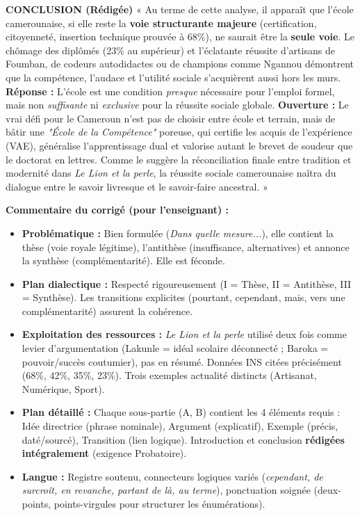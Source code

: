 \documentclass[11pt]{article}
\newcommand{\cle}[1]{{\popxbold\color{popdark}#1}}
\begin{document}
\begin{exoresolu}
\noindent\textbf{CONCLUSION (Rédigée)}
« Au terme de cette analyse, il apparaît que l'école camerounaise, si elle reste la \textbf{voie structurante majeure} (certification, citoyenneté, insertion technique prouvée à 68\%), ne saurait être la \textbf{seule voie}. Le chômage des diplômés (23\% au supérieur) et l'éclatante réussite d'artisans de Foumban, de codeurs autodidactes ou de champions comme Ngannou démontrent que la compétence, l'audace et l'utilité sociale s'acquièrent aussi hors les murs. \textbf{Réponse :} L'école est une condition \emph{presque} nécessaire pour l'emploi formel, mais non \emph{suffisante} ni \emph{exclusive} pour la réussite sociale globale. \textbf{Ouverture :} Le vrai défi pour le Cameroun n'est pas de choisir entre école et terrain, mais de bâtir une \emph{"École de la Compétence"} poreuse, qui certifie les acquis de l'expérience (VAE), généralise l'apprentissage dual et valorise autant le brevet de soudeur que le doctorat en lettres. Comme le suggère la réconciliation finale entre tradition et modernité dans \emph{Le Lion et la perle}, la réussite sociale camerounaise naîtra du dialogue entre le savoir livresque et le savoir-faire ancestral. »

\tcblower
\textbf{Commentaire du corrigé (pour l'enseignant) :}
\begin{itemize}
    \item \textbf{Problématique :} Bien formulée (\emph{Dans quelle mesure...}), elle contient la thèse (voie royale légitime), l'antithèse (insuffisance, alternatives) et annonce la synthèse (complémentarité). Elle est \cle{féconde}.
    \item \textbf{Plan dialectique :} Respecté rigoureusement (I = Thèse, II = Antithèse, III = Synthèse). Les transitions explicites (pourtant, cependant, mais, vers une complémentarité) assurent la cohérence.
    \item \textbf{Exploitation des ressources :} \emph{Le Lion et la perle} utilisé deux fois comme levier d'argumentation (Lakunle = idéal scolaire déconnecté ; Baroka = pouvoir/succès coutumier), pas en résumé. Données INS citées précisément (68\%, 42\%, 35\%, 23\%). Trois exemples actualité distincts (Artisanat, Numérique, Sport).
    \item \textbf{Plan détaillé :} Chaque sous-partie (A, B) contient les 4 éléments requis : Idée directrice (phrase nominale), Argument (explicatif), Exemple (précis, daté/sourcé), Transition (lien logique). Introduction et conclusion \textbf{rédigées intégralement} (exigence Probatoire).
    \item \textbf{Langue :} Registre soutenu, connecteurs logiques variés (\emph{cependant, de surcroît, en revanche, partant de là, au terme}), ponctuation soignée (deux-points, points-virgules pour structurer les énumérations).
\end{itemize}
\end{exoresolu}
\end{document}
